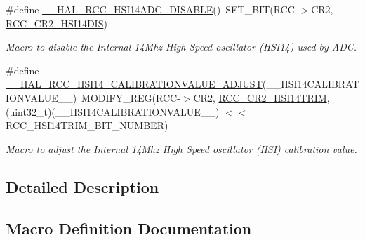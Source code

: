 \begin{DoxyCompactItemize}
\mbox{\label{group___r_c_c___h_s_i14___configuration_gae157dfee3a911f84a68d420e61359a68}} 
\#define \hyperlink{group___r_c_c___h_s_i14___configuration_gae157dfee3a911f84a68d420e61359a68}{\+\_\+\+\_\+\+H\+A\+L\+\_\+\+R\+C\+C\+\_\+\+H\+S\+I14\+A\+D\+C\+\_\+\+D\+I\+S\+A\+B\+LE}()~S\+E\+T\+\_\+\+B\+IT(R\+CC-\/$>$C\+R2, \hyperlink{group___peripheral___registers___bits___definition_gaa9533da17718a4111cd8e1108b41d3a4}{R\+C\+C\+\_\+\+C\+R2\+\_\+\+H\+S\+I14\+D\+IS})
\begin{DoxyCompactList}\small\item\em Macro to disable the Internal 14\+Mhz High Speed oscillator (H\+S\+I14) used by A\+DC. \end{DoxyCompactList}\item 
\#define \hyperlink{group___r_c_c___h_s_i14___configuration_ga50813225c13400010fba77b1b67783f4}{\+\_\+\+\_\+\+H\+A\+L\+\_\+\+R\+C\+C\+\_\+\+H\+S\+I14\+\_\+\+C\+A\+L\+I\+B\+R\+A\+T\+I\+O\+N\+V\+A\+L\+U\+E\+\_\+\+A\+D\+J\+U\+ST}(\+\_\+\+\_\+\+H\+S\+I14\+C\+A\+L\+I\+B\+R\+A\+T\+I\+O\+N\+V\+A\+L\+U\+E\+\_\+\+\_\+)~M\+O\+D\+I\+F\+Y\+\_\+\+R\+EG(R\+CC-\/$>$C\+R2, \hyperlink{group___peripheral___registers___bits___definition_ga45b76ccb2dacdf483d281725ce92d61a}{R\+C\+C\+\_\+\+C\+R2\+\_\+\+H\+S\+I14\+T\+R\+IM}, (uint32\+\_\+t)(\+\_\+\+\_\+\+H\+S\+I14\+C\+A\+L\+I\+B\+R\+A\+T\+I\+O\+N\+V\+A\+L\+U\+E\+\_\+\+\_\+) $<$$<$ R\+C\+C\+\_\+\+H\+S\+I14\+T\+R\+I\+M\+\_\+\+B\+I\+T\+\_\+\+N\+U\+M\+B\+ER)
\begin{DoxyCompactList}\small\item\em Macro to adjust the Internal 14\+Mhz High Speed oscillator (H\+SI) calibration value. \end{DoxyCompactList}\end{DoxyCompactItemize}


\subsection{Detailed Description}


\subsection{Macro Definition Documentation}
\mbox{\label{group___r_c_c___h_s_i14___configuration_ga50813225c13400010fba77b1b67783f4}} 
